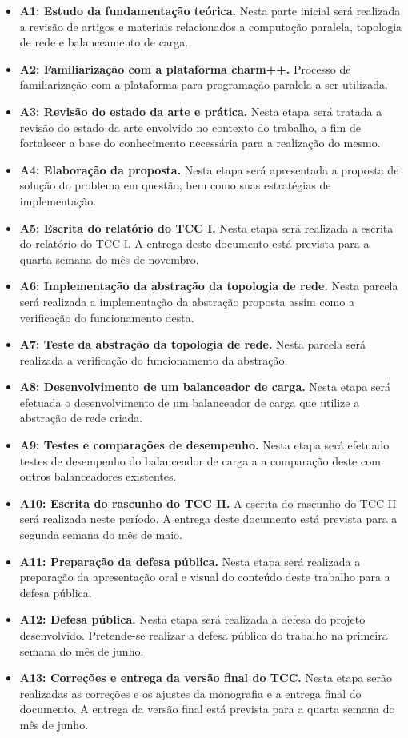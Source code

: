 \documentclass[
	12pt,				%
	openright,			%
	twoside,			%
	a4paper,			%
	english,			%
	brazil,				%
	]{abntex2}
\begin{document}
\begin{itemize}
	\item \textbf{A1: Estudo da fundamentação teórica.} Nesta parte inicial será realizada a revisão de artigos e materiais relacionados a computação paralela, topologia de rede e balanceamento de carga.
	\item \textbf{A2: Familiarização com a plataforma charm++.} Processo de familiarização com a plataforma para programação paralela a ser utilizada.
	\item \textbf{A3: Revisão do estado da arte e prática.} Nesta etapa será tratada a revisão do estado da arte envolvido no contexto do trabalho, a fim de  fortalecer a base do conhecimento necessária para a realização do mesmo.
	\item \textbf{A4: Elaboração da proposta.} Nesta etapa será apresentada a proposta de solução do problema em questão, bem como suas estratégias de implementação.
	\item \textbf{A5: Escrita do relatório do TCC I.} Nesta etapa será realizada a escrita do relatório do TCC I. A entrega deste documento está prevista para a quarta semana do mês de novembro.
	\item \textbf{A6: Implementação da abstração da topologia de rede.} Nesta parcela será realizada a implementação da abstração proposta assim como a verificação do funcionamento desta.
	\item \textbf{A7: Teste da abstração da topologia de rede.} Nesta parcela será realizada a verificação do funcionamento da abstração.
	\item \textbf{A8: Desenvolvimento de um balanceador de carga.} Nesta etapa será efetuada o desenvolvimento de um balanceador de carga que utilize a abstração de rede criada.
	\item \textbf{A9: Testes e comparações de desempenho.} Nesta etapa será efetuado testes de desempenho do balanceador de carga a a comparação deste com outros balanceadores existentes.
	\item \textbf{A10: Escrita do rascunho do TCC II.} A escrita do rascunho do TCC II será realizada neste período. A entrega deste documento está prevista para a segunda semana do mês de maio.
	\item \textbf{A11: Preparação da defesa pública.} Nesta etapa será realizada a preparação da apresentação oral e visual do conteúdo deste trabalho para a defesa pública.
	\item \textbf{A12: Defesa pública.} Nesta etapa será realizada a defesa do projeto desenvolvido. Pretende-se realizar a defesa pública do trabalho na primeira semana do mês de junho.
	\item \textbf{A13: Correções e entrega da versão final do TCC.} Nesta etapa serão realizadas as correções e os ajustes da monografia e a entrega final do documento. A entrega da versão final está prevista para a quarta semana do mês de junho.
\end{itemize}
\end{document}
